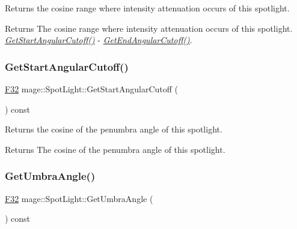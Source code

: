 Returns the cosine range where intensity attenuation occurs of this spotlight.

\begin{DoxyReturn}{Returns}
The cosine range where intensity attenuation occurs of this spotlight. {\itshape \hyperlink{classmage_1_1_spot_light_a649e84aaf1f98c605f14d9597241df72}{Get\+Start\+Angular\+Cutoff()}} -\/ {\itshape \hyperlink{classmage_1_1_spot_light_ad9c4cabf950619605a8040e41b9acb5b}{Get\+End\+Angular\+Cutoff()}}. 
\end{DoxyReturn}
\hypertarget{classmage_1_1_spot_light_a649e84aaf1f98c605f14d9597241df72}{}\label{classmage_1_1_spot_light_a649e84aaf1f98c605f14d9597241df72} 
\subsubsection{\texorpdfstring{Get\+Start\+Angular\+Cutoff()}{GetStartAngularCutoff()}}
{\footnotesize\ttfamily \hyperlink{namespacemage_aa97e833b45f06d60a0a9c4fc22ae02c0}{F32} mage\+::\+Spot\+Light\+::\+Get\+Start\+Angular\+Cutoff (\begin{DoxyParamCaption}{ }\end{DoxyParamCaption}) const\hspace{0.3cm}{\ttfamily [noexcept]}}

Returns the cosine of the penumbra angle of this spotlight.

\begin{DoxyReturn}{Returns}
The cosine of the penumbra angle of this spotlight. 
\end{DoxyReturn}
\hypertarget{classmage_1_1_spot_light_ae29059615f77f1afe414dc826b2d2af8}{}\label{classmage_1_1_spot_light_ae29059615f77f1afe414dc826b2d2af8} 
\subsubsection{\texorpdfstring{Get\+Umbra\+Angle()}{GetUmbraAngle()}}
{\footnotesize\ttfamily \hyperlink{namespacemage_aa97e833b45f06d60a0a9c4fc22ae02c0}{F32} mage\+::\+Spot\+Light\+::\+Get\+Umbra\+Angle (\begin{DoxyParamCaption}{ }\end{DoxyParamCaption}) const\hspace{0.3cm}{\ttfamily [noexcept]}}

